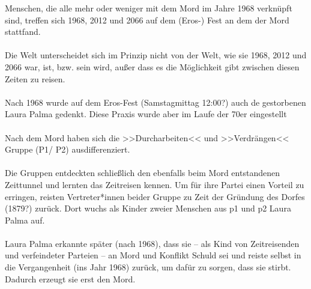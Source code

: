 Menschen, die alle mehr oder weniger mit dem Mord im Jahre 1968 verknüpft sind,
treffen sich 1968, 2012 und 2066 auf dem (Eros-) Fest an dem der Mord
stattfand.\\\\
%
Die Welt unterscheidet sich im Prinzip nicht von der Welt, wie sie 1968, 2012
und 2066 war, ist, bzw. sein wird, außer dass es die Möglichkeit gibt zwischen
diesen Zeiten zu reisen.\\\\
%
Nach 1968 wurde auf dem Eros-Fest (Samstagmittag 12:00?) auch de
gestorbenen Laura Palma gedenkt. Diese Praxis wurde aber im Laufe der 70er
eingestellt\\\\
%
Nach dem Mord haben sich die >>Durcharbeiten<< und >>Verdrängen<< Gruppe (P1/
P2) ausdifferenziert.\\\\
%
Die Gruppen entdeckten schließlich den ebenfalls beim Mord entstandenen 
Zeittunnel und lernten das Zeitreisen kennen. 
Um für ihre Partei einen Vorteil zu erringen, reisten Vertreter*innen beider
Gruppe zu Zeit der Gründung des Dorfes (1879?) zurück. 
Dort wuchs als Kinder zweier Menschen aus p1 und p2 Laura Palma auf.\\\\
% 
Laura Palma erkannte später (nach 1968), dass sie -- als Kind von Zeitreisenden und
verfeindeter Parteien -- an Mord und Konflikt Schuld sei und reiste selbst in
die Vergangenheit (ins Jahr 1968) zurück, um dafür zu sorgen, dass sie stirbt.
Dadurch erzeugt sie erst den Mord.
